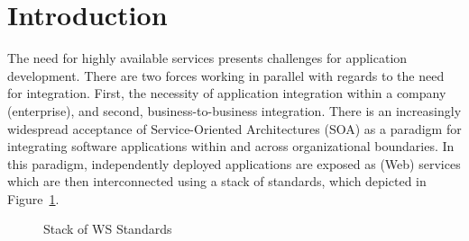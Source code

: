 \documentclass{llncs}
\begin{document}

%
%



\section{Introduction}
\label{sect:introduction}

The need for highly available services presents challenges for application development.
There are two forces working in parallel with regards to the need for integration.
First, the necessity of application integration within a company (enterprise), and second, business-to-business integration.
There is an increasingly widespread acceptance of Service-Oriented Architectures (SOA) as a paradigm for integrating software applications within and across organizational boundaries.
In this paradigm, independently deployed applications are exposed as (Web) services which are then 
interconnected using a stack of standards, which depicted in Figure~\ref{fig:soa-stack}. 
		
		\begin{figure}[ht]
		\begin{centering}
		\caption{Stack of WS Standards}
		\label{fig:soa-stack}
		\end{centering}
		\end{figure}
		
\end{document}
